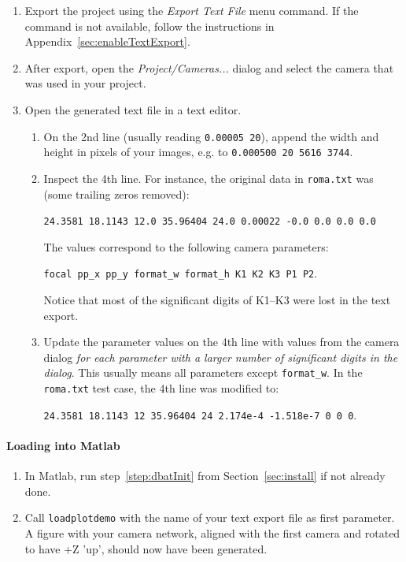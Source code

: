 \documentclass{article}
\begin{document}
\begin{enumerate}
\item Export the project using the \emph{Export Text File} menu
  command. If the command is not available, follow the instructions in
  Appendix~\ref{sec:enableTextExport}.
\item After export, open the \emph{Project/Cameras...} dialog and
  select the camera that was used in your project.
\item Open the generated text file in a text editor.
  \begin{enumerate}
  \item On the 2nd line (usually reading \texttt{0.00005 20}), append
    the width and height in pixels of your images, e.g. to
    \texttt{0.000500 20 5616 3744}.
  \item Inspect the 4th line. For instance,
    the original data in \texttt{roma.txt} was (some trailing zeros removed):

    \texttt{24.3581 18.1143 12.0 35.96404 24.0 0.00022 -0.0 0.0 0.0 0.0}

    The values correspond to the following camera parameters:

    \texttt{focal pp\_x pp\_y format\_w format\_h K1 K2 K3 P1 P2}.

    Notice that most of the significant digits of K1--K3 were lost in
    the text export.
  \item Update the parameter values on the 4th line with values from
    the camera dialog \emph{for each parameter with a larger number of
      significant digits in the dialog}. This usually means all
    parameters except \texttt{format\_w}. In the \texttt{roma.txt}
    test case, the 4th line was modified to:

    \texttt{24.3581 18.1143 12 35.96404 24 2.174e-4 -1.518e-7 0 0 0}.

  \end{enumerate}
\end{enumerate}

\paragraph{Loading into Matlab}

\begin{enumerate}
\item In Matlab, run step~\ref{step:dbatInit} from
  Section~\ref{sec:install} if not already done.
\item Call \texttt{loadplotdemo} with the name of your text export
  file as first parameter. A figure with your camera network, aligned
  with the first camera and rotated to have +Z 'up', should now have
  been generated.
\end{enumerate}
\end{document}
